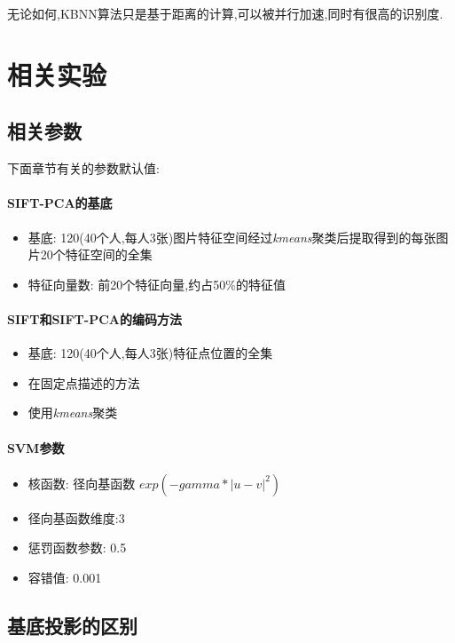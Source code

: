 无论如何,KBNN算法只是基于距离的计算,可以被并行加速,同时有很高的识别度.
\section{相关实验}

\subsection{相关参数}
下面章节有关的参数默认值:

\paragraph{SIFT-PCA的基底}
\begin{itemize}
	\item 基底: 120(40个人,每人3张)图片特征空间经过\textit{kmeans}聚类后提取得到的每张图片20个特征空间的全集
	\item 特征向量数: 前20个特征向量,约占50\%的特征值
\end{itemize}

\paragraph{SIFT和SIFT-PCA的编码方法}
\begin{itemize}
	\item 基底: 120(40个人,每人3张)特征点位置的全集
	\item 在固定点描述的方法
	\item 使用\textit{kmeans}聚类
\end{itemize}

\paragraph{SVM参数}
	\begin{itemize}
		\item 核函数: 径向基函数 $exp(-gamma*|u-v|^2)$
		\item 径向基函数维度:3
		\item 惩罚函数参数: 0.5
		\item 容错值: 0.001
	\end{itemize}



\subsection{基底投影的区别}

